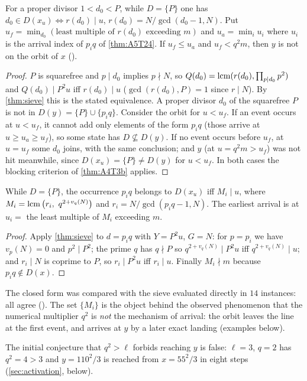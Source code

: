 \begin{theorem}\label{thm:A5T11}
For a proper divisor $1<d_0<P$, while $D=\{P\}$ one has $d_0\in D(x_u)\iff r(d_0)\mid u$, $r(d_0)=N/\gcd(d_0-1,N)$. Put $u_f=\min_{d_0}(\text{least multiple of }r(d_0)\text{ exceeding }m)$ and $u_a=\min_iu_i$ where $u_i$ is the arrival index of $p_iq$ of \cref{thm:A5T24}. If $u_f\le u_a$ and $u_f<q^2m$, then $y$ is not on the orbit of $x$ ().
\end{theorem}
\begin{proof}
$P$ is squarefree and $p\mid d_0$ implies $p\nmid N$, so $Q(d_0)=\operatorname{lcm}(r(d_0),\prod_{p\mid d_0}p^2)$ and $Q(d_0)\mid P^2u$ iff $r(d_0)\mid u$ ($\gcd(r(d_0),P)=1$ since $r\mid N$). By \cref{thm:sieve} this is the stated equivalence. A proper divisor $d_0$ of the squarefree $P$ is not in $D(y)=\{P\}\cup\{p_iq\}$. Consider the orbit for $u<u_f$. If an event occurs at $u<u_f$, it cannot add only elements of the form $p_iq$ (those arrive at $u\ge u_a\ge u_f$), so some state has $D\not\subseteq D(y)$. If no event occurs before $u_f$, at $u=u_f$ some $d_0$ joins, with the same conclusion; and $y$ (at $u=q^2m>u_f$) was not hit meanwhile, since $D(x_u)=\{P\}\ne D(y)$ for $u<u_f$. In both cases the blocking criterion of \cref{thm:A4T3b} applies. \qedhere
\end{proof}
\begin{theorem}\label{thm:A5T24}
While $D=\{P\}$, the occurrence $p_iq$ belongs to $D(x_u)$ iff $M_i\mid u$, where $M_i=\lcm\big(r_i,\ q^{2+v_q(N)}\big)$ and $r_i=N/\gcd(p_iq-1,N)$. The earliest arrival is at $u_i=$ the least multiple of $M_i$ exceeding $m$.
\end{theorem}
\begin{proof}
Apply \cref{thm:sieve} to $d=p_iq$ with $Y=P^2u$, $G=N$: for $p=p_i$ we have $v_{p}(N)=0$ and $p^2\mid P^2$; the prime $q$ has $q\nmid P$ so $q^{2+v_q(N)}\mid P^2u$ iff $q^{2+v_q(N)}\mid u$; and $r_i\mid N$ is coprime to $P$, so $r_i\mid P^2u$ iff $r_i\mid u$. Finally $M_i\nmid m$ because $p_iq\notin D(x)$. \qedhere
\end{proof}
\begin{remark}
The closed form was compared with the sieve evaluated directly in $14$ instances: all agree (). The set $\{M_i\}$ is the object behind the observed phenomenon that the numerical multiplier $q^2$ is \emph{not} the mechanism of arrival: the orbit leaves the line at the first event, and arrives at $y$ by a later exact landing (examples below).
\end{remark}
\begin{counter}\label{cx:q2l}
The initial conjecture that $q^2>\ell$ forbids reaching $y$ is false: $\ell=3$, $q=2$ has $q^2=4>3$ and $y=110^2/3$ is reached from $x=55^2/3$ in eight steps (\cref{sec:activation}, below).
\end{counter}


